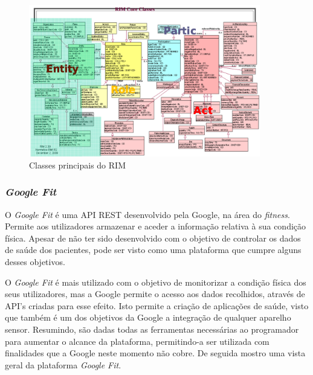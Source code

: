 \begin{figure}[H]
  \centering
  \includegraphics[width=0.9\textwidth]{imgs/hl7-rim.png}
  \caption[Classes principais do \gls{RIM}]{Classes principais do \gls{RIM} \cite{hl7-rim}}
  
  \label{f:rimclass}
\end{figure}




\subsubsection{\textit{Google Fit}}
O \textit{Google Fit} é uma \gls{API} \gls{REST} desenvolvido pela Google, na área do \textit{fitness}. Permite aos utilizadores armazenar e aceder a informação relativa à sua condição física. Apesar de não ter sido desenvolvido com o objetivo de controlar os dados de saúde dos pacientes, pode ser visto como uma plataforma que cumpre alguns desses objetivos.
\par 
O \textit{Google Fit} é mais utilizado com o objetivo de monitorizar a condição física dos seus utilizadores, mas a Google permite o acesso aos dados recolhidos, através de \gls{API}’s criadas para esse efeito. Isto permite a criação de aplicações de saúde, visto que também é um dos objetivos da Google a integração de qualquer aparelho sensor. Resumindo, são dadas todas as ferramentas necessárias ao programador para aumentar o alcance da plataforma, permitindo-a ser utilizada com finalidades que a Google neste momento não cobre. 
De seguida mostro uma vista geral da plataforma \textit{Google Fit}.

